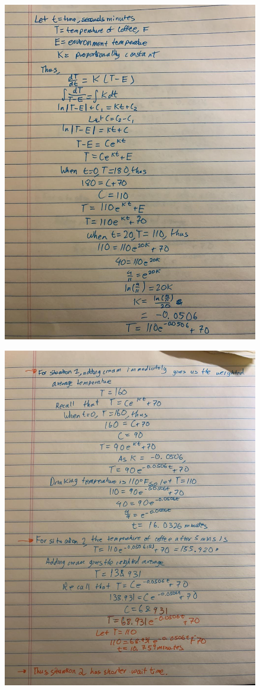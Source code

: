 \documentclass{article}
\begin{document}
    \pagebreak

    \begin{figure}[hbt!]
        \centering
        \includegraphics[scale=0.4]{coffee1}
    \end{figure}

    \begin{figure}[hbt!]
        \centering
        \includegraphics[scale=0.4]{coffee2}
    \end{figure}
\end{document}
